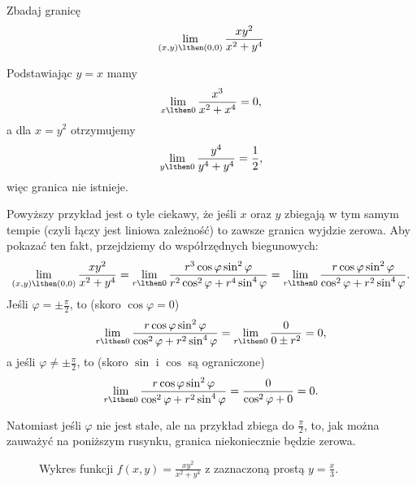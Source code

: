 \begin{example}
    Zbadaj granicę
    \[ \lim_{(x, y)\lthen (0, 0)} \frac{xy^2}{x^2 + y^4} \]
\end{example}
\begin{solution}
    Podstawiając $y = x$ mamy
    \[ \lim_{x\lthen 0} \frac{x^3}{x^2 + x^4} = 0, \]
    a dla $x = y^2$ otrzymujemy
    \[ \lim_{y\lthen 0} \frac{y^4}{y^4 + y^4} = \frac{1}{2}, \]
    więc granica nie istnieje.
\end{solution}

\begin{remark*}
    Powyższy przykład jest o tyle ciekawy, że jeśli $x$ oraz $y$ zbiegają w tym samym tempie (czyli łączy jest liniowa zależność) to zawsze granica wyjdzie zerowa. Aby pokazać ten fakt, przejdziemy do współrzędnych biegunowych:
    \[ \lim_{(x, y)\lthen (0, 0)} \frac{xy^2}{x^2 + y^4}  = \lim_{r\lthen 0} \frac{r^3 \cos\varphi\sin^2\varphi}{r^2\cos^2\varphi + r^4\sin^4\varphi} = \lim_{r\lthen 0} \frac{r \cos\varphi\sin^2\varphi}{\cos^2\varphi + r^2\sin^4\varphi}. \]
    Jeśli $\varphi = \pm\frac{\pi}{2}$, to (skoro $\cos\varphi = 0$)
    \[ \lim_{r\lthen 0} \frac{r \cos\varphi\sin^2\varphi}{\cos^2\varphi + r^2\sin^4\varphi} = \lim_{r\lthen 0} \frac{0}{0 \pm r^2} = 0, \]
    a jeśli $\varphi \neq \pm\frac{\pi}{2}$, to (skoro $\sin$ i $\cos$ są ograniczone)
    \[ \lim_{r\lthen 0} \frac{r \cos\varphi\sin^2\varphi}{\cos^2\varphi + r^2\sin^4\varphi} = \frac{0}{\cos^2\varphi + 0} = 0. \]

    Natomiast jeśli $\varphi$ nie jest stałe, ale na przykład zbiega do $\frac{\pi}{2}$, to, jak można zauważyć na poniższym rusynku, granica niekoniecznie będzie zerowa.
\end{remark*}

\begin{figure}[H]
    \centering
    \caption[short]{Wykres funkcji $f(x, y) = \frac{xy^2}{x^2 + y^4}$ z zaznaczoną prostą $y = \frac{x}{3}$.}
\end{figure}